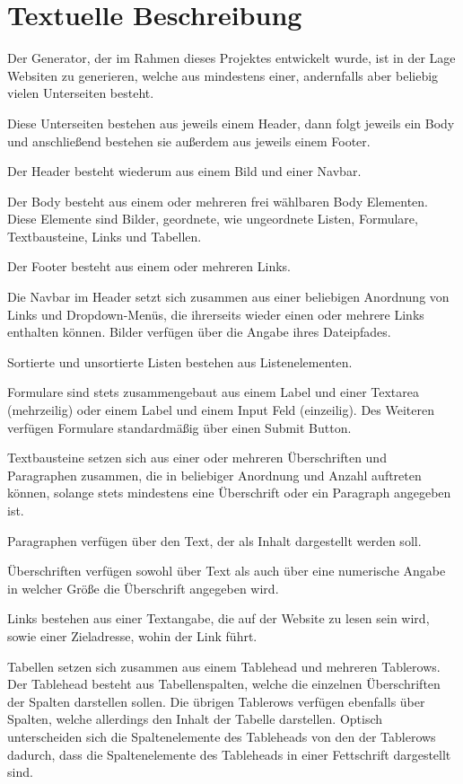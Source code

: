 \thispagestyle{plain}
\vspace*{2cm}
\section{Textuelle Beschreibung}
Der Generator, der im Rahmen dieses Projektes entwickelt wurde, ist in der Lage Websiten zu generieren, welche aus mindestens einer, andernfalls aber beliebig vielen Unterseiten besteht. 

Diese Unterseiten bestehen aus jeweils einem Header, dann folgt jeweils ein Body und anschließend bestehen sie außerdem aus jeweils einem Footer.

Der Header besteht wiederum aus einem Bild und einer Navbar.

Der Body besteht aus einem oder mehreren frei wählbaren Body Elementen. Diese Elemente sind Bilder, geordnete, wie ungeordnete Listen, Formulare, Textbausteine, Links und Tabellen.

Der Footer besteht aus einem oder mehreren Links.

Die Navbar im Header setzt sich zusammen aus einer beliebigen Anordnung von Links und Dropdown-Menüs, die ihrerseits wieder einen oder mehrere Links enthalten können.
Bilder verfügen über die Angabe ihres Dateipfades.

Sortierte und unsortierte Listen bestehen aus Listenelementen.

Formulare sind stets zusammengebaut aus einem Label und einer Textarea (mehrzeilig) oder einem Label und einem Input Feld (einzeilig). Des Weiteren verfügen Formulare standardmäßig über einen Submit Button.

Textbausteine setzen sich aus einer oder mehreren Überschriften und Paragraphen zusammen, die in beliebiger Anordnung und Anzahl auftreten können, solange stets mindestens eine Überschrift oder ein Paragraph angegeben ist.

Paragraphen verfügen über den Text, der als Inhalt dargestellt werden soll.

Überschriften verfügen sowohl über Text als auch über eine numerische Angabe in welcher Größe die Überschrift angegeben wird.

Links bestehen aus einer Textangabe, die auf der Website zu lesen sein wird, sowie einer Zieladresse, wohin der Link führt.

Tabellen setzen sich zusammen aus einem Tablehead und mehreren Tablerows. Der Tablehead besteht aus Tabellenspalten, welche die einzelnen Überschriften der Spalten darstellen sollen. Die übrigen Tablerows verfügen ebenfalls über Spalten, welche allerdings den Inhalt der Tabelle darstellen. Optisch unterscheiden sich die Spaltenelemente des Tableheads von den der Tablerows dadurch, dass die Spaltenelemente des Tableheads in einer Fettschrift dargestellt sind.
